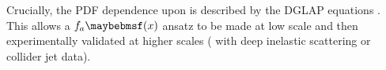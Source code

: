 Crucially, the \ac{PDF} dependence upon \muf is described by the DGLAP equations 
\cite{Gribov:1972,Altarelli:1977,Dokshitser:1977}. This allows a $f_a \parenths{x}$ 
ansatz to be made at low scale and then experimentally validated at higher scales (\eg 
with deep inelastic scattering or collider jet data).
